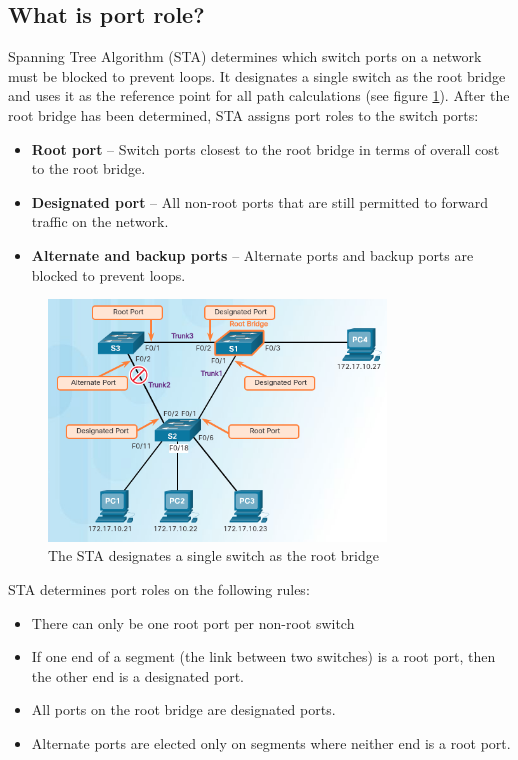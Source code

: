 \subsection{What is port role?}

Spanning Tree Algorithm (STA) determines which switch ports on a network must be blocked to prevent loops. It designates a single switch as the root bridge and uses it as the reference point for all path calculations (see figure \ref{STP-operation}). After the root bridge has been determined, STA assigns port roles to the switch ports:

\begin{itemize}
\item \textbf{Root port} -- Switch ports closest to the root bridge in terms of overall cost to the root bridge.
\item \textbf{Designated port} -- All non-root ports that are still permitted to forward traffic on the network.
\item \textbf{Alternate and backup ports} -- Alternate ports and backup ports are blocked to prevent loops. 
\end{itemize}

\begin{figure}[hbtp]
\centering
\includegraphics[width=0.8\textwidth]{pictures/STP-operation.png}
\caption{The STA designates a single switch as the root bridge}
\label{STP-operation}
\end{figure}

STA determines port roles on the following rules:

\begin{itemize}
\item There can only be one root port per non-root switch
\item If one end of a segment (the link between two switches) is a root port, then the other end is a designated port.
\item All ports on the root bridge are designated ports.
\item Alternate ports are elected only on segments where neither end is a root port.
\end{itemize}


